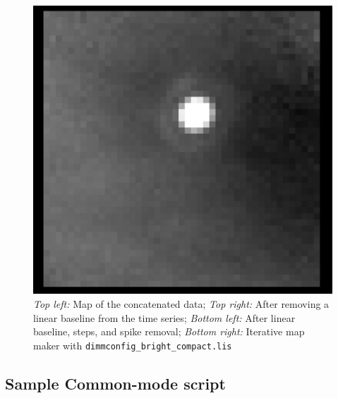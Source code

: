 \documentclass[twoside,11pt]{starlink}
\begin{document}
\begin{figure}[ht]
\begin{center}
\includegraphics[width=0.45\linewidth]
           {sc19_dimmconfig_bright_compact_smallmap}
\caption{
\textsl{Top left:} Map of the concatenated data;
\textsl{Top right:} After removing a linear baseline from the time series;
\textsl{Bottom left:} After linear baseline, steps, and spike removal;
\textsl{Bottom right:} Iterative map maker with \texttt{dimmconfig\_bright\_compact.lis}
}
\label{fig:samplemaps}
\end{center}
\end{figure}


\newpage
\subsection{Sample Common-mode script}
\label{sec:script}
\end{document}
